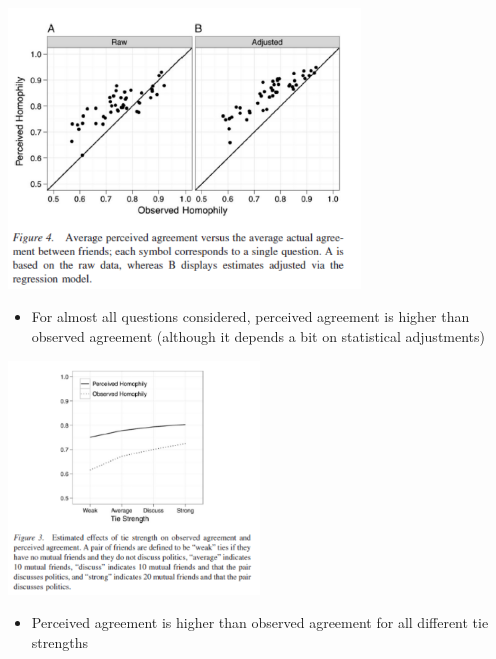 \documentclass[aspectratio=169]{beamer}
\begin{document}
\begin{frame}

\begin{center}
\includegraphics[width=0.7\textwidth]{figures/goel_real_2010_fig4}
\end{center}

\begin{itemize}
\item For almost all questions considered, perceived agreement is higher than observed agreement (although it depends a bit on statistical adjustments)
\end{itemize}

\end{frame}
\begin{frame}

\begin{center}
\includegraphics[width=0.5\textwidth]{figures/goel_real_2010_fig3}
\end{center}

\begin{itemize}
\item Perceived agreement is higher than observed agreement for all different tie strengths
\end{itemize}

\end{frame}
\end{document}

